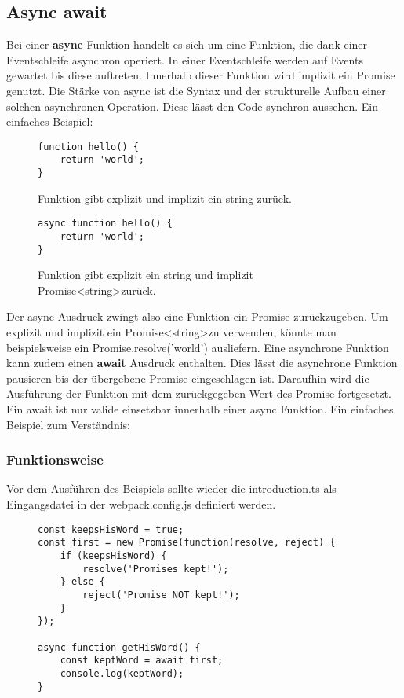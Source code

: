 \subsection{Async await}
Bei einer \textbf{async} Funktion handelt es sich um eine Funktion, die dank einer Eventschleife asynchron operiert. In einer Eventschleife werden auf Events gewartet bis diese auftreten. Innerhalb dieser Funktion wird implizit ein Promise genutzt. Die Stärke von async ist die Syntax und der strukturelle Aufbau einer solchen asynchronen Operation. Diese lässt den Code synchron aussehen.\cite{async-await} Ein einfaches Beispiel:

\begin{figure}[H]
\begin{lstlisting}
function hello() {
    return 'world';
}
\end{lstlisting}
\caption{Funktion gibt explizit und implizit ein string zurück.}
\end{figure}

\begin{figure}[H]
\begin{lstlisting}
async function hello() {
    return 'world';
}
\end{lstlisting}
\caption{Funktion gibt explizit ein string und implizit Promise\textless string\textgreater zurück.}
\end{figure}

\noindent
Der async Ausdruck zwingt also eine Funktion ein Promise zurückzugeben. Um explizit und implizit ein Promise\textless string\textgreater zu verwenden, könnte man beispielsweise ein Promise.resolve('world') ausliefern. Eine asynchrone Funktion kann zudem einen \textbf{await} Ausdruck enthalten. Dies lässt die asynchrone Funktion pausieren bis der übergebene Promise eingeschlagen ist. Daraufhin wird die Ausführung der Funktion mit dem zurückgegeben Wert des Promise fortgesetzt. Ein await ist nur valide einsetzbar innerhalb einer async Funktion. Ein einfaches Beispiel zum Verständnis:\\

\subsubsection{Funktionsweise}

\noindent
Vor dem Ausführen des Beispiels sollte wieder die introduction.ts als Eingangsdatei in der webpack.config.js definiert werden.

\begin{figure}[H]
\begin{lstlisting}
const keepsHisWord = true;
const first = new Promise(function(resolve, reject) {
    if (keepsHisWord) {
        resolve('Promises kept!');
    } else {
        reject('Promise NOT kept!');
    }
});

async function getHisWord() {
    const keptWord = await first;
    console.log(keptWord);
}
\end{lstlisting}
\end{figure}

